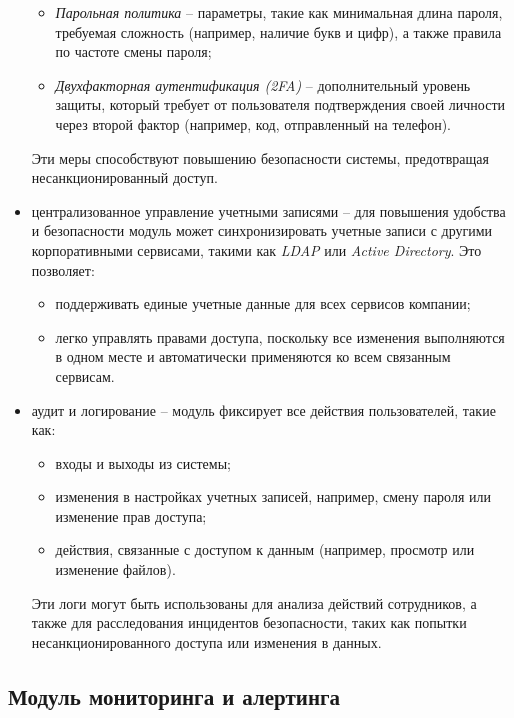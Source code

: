 \begin{itemize}
    \begin{itemize}
        \item \textit{Парольная политика} -- параметры, такие как минимальная длина пароля, требуемая сложность (например, наличие букв и цифр), а также правила по частоте смены пароля;
        \item \textit{Двухфакторная аутентификация (2FA)} -- дополнительный уровень защиты, который требует от пользователя подтверждения своей личности через второй фактор (например, код, отправленный на телефон).
    \end{itemize}
    Эти меры способствуют повышению безопасности системы, предотвращая несанкционированный доступ.
    \item централизованное управление учетными записями -- для повышения удобства и безопасности модуль может синхронизировать учетные записи с другими корпоративными сервисами, такими как \textit{LDAP} или \textit{Active Directory}. Это позволяет:
    \begin{itemize}
        \item поддерживать единые учетные данные для всех сервисов компании;
        \item легко управлять правами доступа, поскольку все изменения выполняются в одном месте и автоматически применяются ко всем связанным сервисам.
    \end{itemize}
    \item аудит и логирование -- модуль фиксирует все действия пользователей, такие как:
    \begin{itemize}
        \item входы и выходы из системы;
        \item изменения в настройках учетных записей, например, смену пароля или изменение прав доступа;
        \item действия, связанные с доступом к данным (например, просмотр или изменение файлов).
    \end{itemize}
    Эти логи могут быть использованы для анализа действий сотрудников, а также для расследования инцидентов безопасности, таких как попытки несанкционированного доступа или изменения в данных.
\end{itemize}

\subsection{Модуль мониторинга и алертинга}
\label{sec:monitoring_alerting_functionality}

